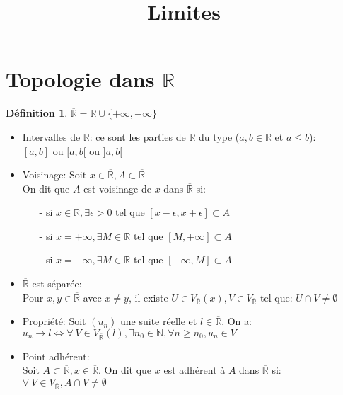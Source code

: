 \documentclass[fleqn]{article}
\title{Limites}
\date{}
\theoremstyle{definition} \newtheorem*{defi}{D\'efinition}
\theoremstyle{definition} \newtheorem*{theo}{Th\'eor\`eme}
\theoremstyle{definition} \newtheorem*{adh}{Caract\'erisation s\'equentielle de l'adh\'erence}
\theoremstyle{remark} \newtheorem*{rqs}{Remarques}
\begin{document}
\maketitle

\section{Topologie dans $\overline{\mathbb{R}}$}
\begin{defi}
	$\overline{\mathbb{R}} = \mathbb{R} \cup \{ +\infty, -\infty\}$
\end{defi}
\begin{itemize}
	\item Intervalles de $\overline{\mathbb{R}}$: ce sont les parties de $\overline{\mathbb{R}}$ du type ($a,b \in \overline{\mathbb{R}}$ et
		$a \leq b$): \\
		$[a,b]$ ou $[a,b[$ ou $]a,b[$
	\item Voisinage: Soit $x \in \overline{\mathbb{R}}, A \subset \overline{\mathbb{R}}$ \\
		On dit que $A$ est voisinage de $x$ dans $\overline{\mathbb{R}}$ si:
		\begin{itemize}
			\item[-] si $x \in \mathbb{R}, \exists \epsilon > 0$ tel que $[x - \epsilon, x + \epsilon] \subset A$
			\item[-] si $x = +\infty, \exists M \in \mathbb{R}$ tel que $[M, +\infty] \subset A$
			\item[-] si $x = - \infty, \exists M \in \mathbb{R}$ tel que $[-\infty, M] \subset A$
		\end{itemize}
	\item $\overline{\mathbb{R}}$ est s\'epar\'ee: \\
		Pour $x, y \in \overline{\mathbb{R}}$ avec $x \neq y$, il existe $U \in V_{\overline{\mathbb{R}}}(x), V \in V_{\overline{\mathbb{R}}}$
		tel que: $U \cap V \neq \emptyset$
	\item Propri\'et\'e: Soit $(u_n)$ une suite r\'eelle et $l \in \overline{\mathbb{R}}$. On a: \\
		$u_n \rightarrow l \Leftrightarrow \forall\ V \in V_{\overline{\mathbb{R}}}(l), \exists n_0 \in \mathbb{N}, \forall n \geq n_0, u_n
		\in V$
	\item Point adh\'erent: \\
		Soit $A \subset \overline{\mathbb{R}}, x \in \overline{\mathbb{R}}$. On dit que $x$ est adh\'erent \`a $A$ dans
		$\overline{\mathbb{R}}$ si: \\
		$\forall\ V \in V_{\overline{\mathbb{R}}}, A \cap V \neq \emptyset$
\end{itemize}
\end{document}
